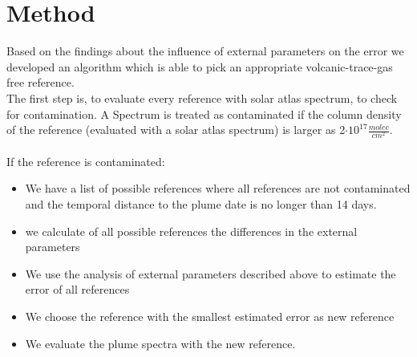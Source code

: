 \documentclass  [
  paper    = a4,
  BCOR     = 10mm,
  twoside,
  fontsize = 12pt,
  fleqn,
  toc      = bibnumbered,
  toc      = listofnumbered,
  numbers  = noendperiod,
  headings = normal,
  listof   = leveldown,
  version  = 3.03
]                                       {scrreprt}
\begin{document}
	\chapter{Method}
	Based on the findings about the influence of external parameters on the  error we developed an algorithm which is able to pick an appropriate volcanic-trace-gas free reference.\\ 
	The first step is, to evaluate every reference with solar atlas spectrum, to check for contamination.	A Spectrum is treated as contaminated if the  column density of the reference (evaluated with a solar atlas spectrum) is larger as 2$\cdot 10^{17}\frac{molec}{cm^2}$.\\
	\\
	If the reference is contaminated:
	\begin{itemize}
		\item We have a list of possible references where all references are not contaminated and the temporal distance to the plume date is no longer than 14 days.
		\item we calculate of all possible references the differences in the external parameters
		\item We use the analysis of external parameters described above to estimate the  error of all references
		\item We choose the reference with the smallest estimated  error as new reference
		\item We evaluate the plume spectra with the new reference.
	\end{itemize}
\end{document}
